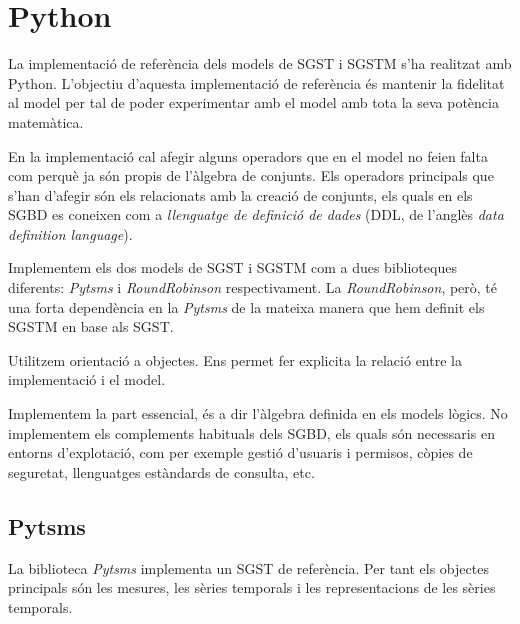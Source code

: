 

\chapter{Python}


La implementació de referència dels models de SGST i SGSTM s'ha
realitzat amb Python. L'objectiu d'aquesta implementació de referència és mantenir la fidelitat al model per tal de poder experimentar amb el model amb tota la seva potència matemàtica. 

En la implementació cal afegir alguns operadors que en el model no
feien falta com perquè ja són propis de l'àlgebra de conjunts. Els
operadors principals que s'han d'afegir són els relacionats amb la
creació de conjunts, els quals en els SGBD es coneixen com a
\emph{llenguatge de definició de dades} (DDL, de l'anglès \emph{data
  definition language}).


Implementem els dos models de SGST i SGSTM com a dues biblioteques
diferents: \emph{Pytsms} i \emph{RoundRobinson} respectivament. La
\emph{RoundRobinson}, però, té una forta dependència en la
\emph{Pytsms} de la mateixa manera que hem definit els SGSTM en base
als SGST.


Utilitzem orientació a objectes. Ens permet fer explicita la relació entre la implementació i el model.



Implementem la part essencial, és a dir l'àlgebra definida en els
models lògics. No implementem els complements habituals dels SGBD, els
quals són necessaris en entorns d'explotació, com per exemple gestió
d'usuaris i permisos, còpies de seguretat, llenguatges estàndards de
consulta, etc.




\section{Pytsms}

La biblioteca \emph{Pytsms} implementa un SGST de referència. Per tant
els objectes principals són les mesures, les sèries temporals i les
representacions de les sèries temporals. 




